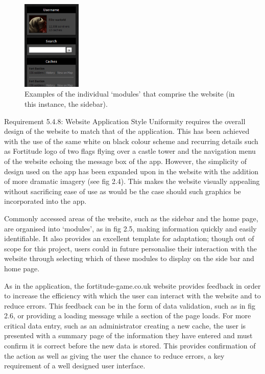 \begin{figure}
	\vspace{-15pt}
	\begin{center}
	\includegraphics[width=0.25\textwidth]{images/sidebar_modules}
	\caption{Examples of the individual ‘modules’ that comprise the website (in this instance, the sidebar).}
	\label{sidebar_modules}
	\end{center}
	\vspace{-20pt}
\end{figure}

Requirement 5.4.8: Website Application Style Uniformity requires the overall design of the website to match that of the application. This has been achieved with the use of the same white on black colour scheme and recurring details such as Fortitude logo of two flags flying over a castle tower and the navigation menu of the website echoing the message box of the app. However, the simplicity of design used on the app has been expanded upon in the website with the addition of more dramatic imagery (see fig 2.4). This makes the website visually appealing without sacrificing ease of use as would be the case should such graphics be incorporated into the app.

Commonly accessed areas of the website, such as the sidebar and the home page, are organised into `modules', as in fig 2.5, making information quickly and easily identifiable. It also provides an excellent template for adaptation; though out of scope for this project, users could in future personalise their interaction with the website through selecting which of these modules to display on the side bar and home page. 


As in the application, the fortitude-game.co.uk website provides feedback in order to increase the efficiency with which the user can interact with the website and to reduce errors. This feedback can be in the form of data validation, such as in fig 2.6, or providing  a loading message while a section of the page loads. For more critical data entry, such as an administrator creating a new cache, the user is presented with a summary page of the information they have entered and must confirm it is correct before the new data is stored. This provides confirmation of the action as well as giving the user the chance to reduce errors, a key requirement of a well designed user interface.

